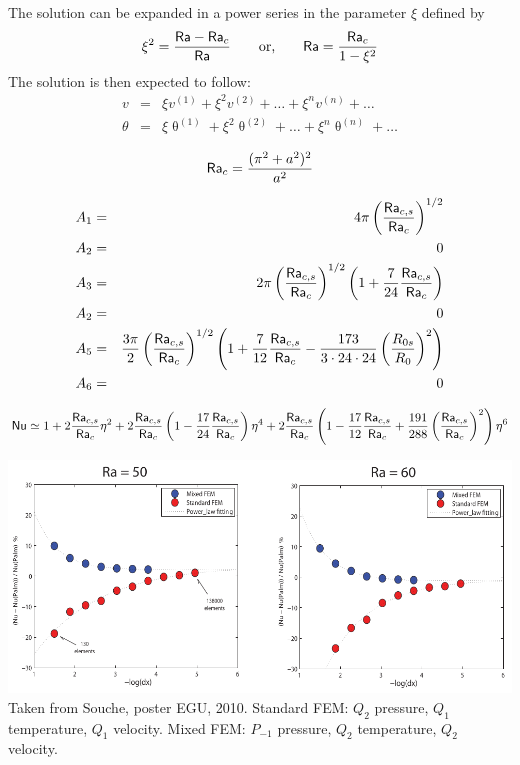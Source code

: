 The solution can be expanded in a power series in the parameter $\xi$ defined by 
\[
\xi^2 = \frac{{\mathsf{Ra}}-{\mathsf{Ra}}_c}{{\mathsf{Ra}}}
\qquad
\text{or,}\qquad
{\mathsf{Ra}} = \frac{{\mathsf{Ra}}_c}{1-\xi^2}
\]
The solution is then expected to follow:
\begin{eqnarray}
v &=& \xi v^{(1)} + \xi^2 v^{(2)} + \dots + \xi^n v^{(n)} + \dots \\
\theta &=& \xi \uptheta^{(1)} + \xi^2 \uptheta^{(2)} + \dots + \xi^n \uptheta^{(n)} + \dots 
\end{eqnarray}


\[
{\mathsf{Ra}}_c = \frac{(\pi^2+a^2)^2}{a^2}
\]

\begin{eqnarray}
A_1&=&4\pi \left( \frac{{\mathsf{Ra}}_{c,s}}{{\mathsf{Ra}}_c} \right)^{1/2} \nonumber\\
A_2 &=& 0 \nonumber\\
A_3&=&2\pi \left(\frac{{\mathsf{Ra}}_{c,s}}{{\mathsf{Ra}}_c} \right)^{1/2} \left(1 + \frac{7}{24} \frac{{\mathsf{Ra}}_{c,s}}{{\mathsf{Ra}}_c}   \right) \nonumber\\
A_2 &=& 0 \nonumber\\
A_5&=&\frac{3\pi}{2} \left(\frac{{\mathsf{Ra}}_{c,s}}{{\mathsf{Ra}}_c} \right)^{1/2}
\left(1+\frac{7}{12} \frac{{\mathsf{Ra}}_{c,s}}{{\mathsf{Ra}}_c} -
\frac{173}{3\cdot24\cdot24} \left(\frac{R_{0s}}{R_0}\right) ^2 
\right) \nonumber\\
A_6 &=& 0 \nonumber
\end{eqnarray}


\[
{\mathsf{Nu}}
\simeq 1 + 2 \frac{{\mathsf{Ra}}_{c,s}}{{\mathsf{Ra}}_c} \eta^2
+ 2 \frac{{\mathsf{Ra}}_{c,s}}{{\mathsf{Ra}}_c}
\left( 1 -\frac{17}{24}\frac{{\mathsf{Ra}}_{c,s}}{{\mathsf{Ra}}_c} \right) \eta^4
+2 \frac{{\mathsf{Ra}}_{c,s}}{{\mathsf{Ra}}_c}
\left( 
1 -\frac{17}{12}\frac{{\mathsf{Ra}}_{c,s}}{{\mathsf{Ra}}_c}
+ \frac{191}{288} \left(\frac{{\mathsf{Ra}}_{c,s}}{{\mathsf{Ra}}_c}\right) ^2
\right) \eta^6 
\]



\begin{center}
\includegraphics[width=14cm]{python_codes/fieldstone_107/images/souche_bench}\\
Taken from Souche, poster EGU, 2010. Standard FEM: $Q_2$ pressure, 
$Q_1$ temperature, $Q_1$ velocity. 
Mixed FEM: $P_{-1}$ pressure, $Q_2$ temperature, $Q_2$ velocity.
\end{center}





